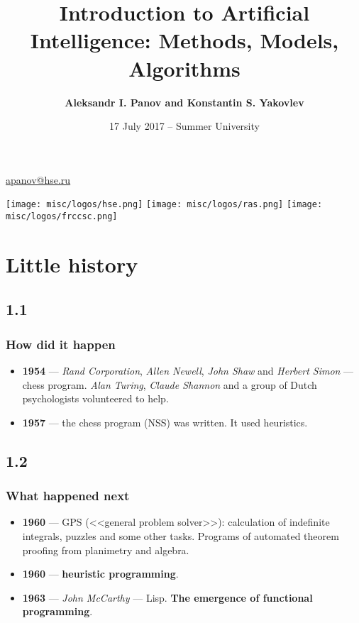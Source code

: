 \documentclass[default]{beamer}
\begin{document}
	
	\title[Introduction to AI]{Introduction to Artificial Intelligence: Methods, Models, Algorithms}
	\author[Panov]{\textbf{Aleksandr I. Panov and Konstantin S. Yakovlev}}
	\date{17 July 2017 -- Summer University} 
	
	{
	\begin{frame}
		
		\titlepage
		\centering
		\href{mailto:apanov@hse.ru}{apanov@hse.ru}
		
		\texttt{[image: misc/logos/hse.png]} \hspace{10pt}
		\texttt{[image: misc/logos/ras.png]} \hspace{10pt}
		\texttt{[image: misc/logos/frccsc.png]}
		
	\end{frame}
	}	

	\section{Little history}
	\subsection{1.1}
	\begin{frame}
		\frametitle{How did it happen}

		\begin{itemize}
			\item \textbf{1954} --- \textit{Rand Corporation}, \textit{Allen Newell}, \textit{John Shaw} and \textit{Herbert Simon}  --- chess program. \textit{Alan Turing}, \textit{Claude Shannon} and a group of Dutch psychologists volunteered to help.
			\item \textbf{1957} --- the chess program (NSS) was written. It used heuristics.
		\end{itemize}
	\end{frame}
	\subsection{1.2}
	\begin{frame}
	\frametitle{What happened next}
	
		\begin{itemize}
			\item \textbf{1960}  --- GPS (<<general problem solver>>): calculation of indefinite integrals, puzzles and some other tasks.  Programs of automated theorem proofing from planimetry and algebra. 
			\item \textbf{1960} --- \textbf{heuristic programming}. 
			\item \textbf{1963} --- \textit{John McCarthy} --- Lisp. \textbf{The emergence of functional programming}.
		\end{itemize}
	\end{frame}
\end{document}
